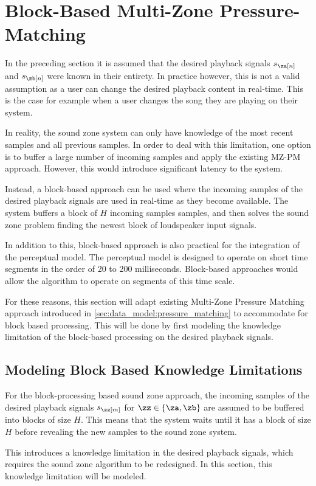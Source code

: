 \section{Block-Based Multi-Zone Pressure-Matching}
In the preceding section it is assumed that the desired playback signals $s_\za[n]$ and $s_\zb[n]$ were known in their entirety.
In practice however, this is not a valid assumption as a user can change the desired playback content in real-time.
This is the case for example when a user changes the song they are playing on their system.

In reality, the sound zone system can only have knowledge of the most recent samples and all previous samples.
In order to deal with this limitation, one option is to buffer a large number of incoming samples and apply the existing MZ-PM approach.
However, this would introduce significant latency to the system.

Instead, a block-based approach can be used where the incoming samples of the desired playback signals are used in real-time as they become available.
The system buffers a block of $H$ incoming samples samples, and then solves the sound zone problem finding the newest block of loudspeaker input signals.

In addition to this, block-based approach is also practical for the integration of the perceptual model.
The perceptual model is designed to operate on short time segments in the order of 20 to 200 milliseconds.
Block-based approaches would allow the algorithm to operate on segments of this time scale.

For these reasons, this section will adapt existing Multi-Zone Pressure Matching approach introduced in 
\autoref{sec:data_model:pressure_matching} to accommodate for block based processing.
This will be done by first modeling the knowledge limitation of the block-based processing on the desired playback signals.

\subsection{Modeling Block Based Knowledge Limitations}
For the block-processing based sound zone approach, the incoming samples of the desired playback signals 
$s_\zz[m]$ for $\zz\in\left\{\za,\zb\right\}$ are assumed to be buffered into blocks of size $H$.
This means that the system waits until it has a block of size $H$ before revealing the new samples to the sound zone system.

This introduces a knowledge limitation in the desired playback signals, which requires the sound zone algorithm to be redesigned.
In this section, this knowledge limitation will be modeled.

